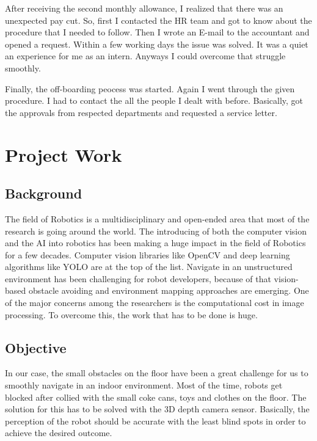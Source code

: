 \documentclass[twoside,12pt,times,onecolumn,a4paper]{report}
\begin{document}
After receiving the second monthly allowance, I realized that there was an unexpected pay cut. So, first I contacted the HR team and got to know about the procedure that I needed to follow. Then I wrote an E-mail to the accountant and opened a request. Within a few working days the issue was solved. It was a quiet an experience for me as an intern. Anyways I could overcome that struggle smoothly. 

Finally, the off-boarding peocess was started. Again I went through the given procedure. I had to contact the all the people I dealt with before. Basically, got the approvals from respected departments and requested a service letter. 


\chapter{Project Work}

\section{Background}

\hspace{3em}The field of Robotics is a multidisciplinary and open-ended area that most of 
the research is going around the world. The introducing of both the computer vision 
and the AI into robotics has been making a huge impact in the field of Robotics for 
a few decades. Computer vision libraries like OpenCV and deep learning 
algorithms like YOLO are at the top of the list. Navigate in an unstructured 
environment has been challenging for robot developers, because of that vision-based obstacle avoiding and environment mapping approaches are emerging. One 
of the major concerns among the researchers is the computational cost in image 
processing. To overcome this, the work that has to be done is huge.

\section{Objective}

In our case, the small obstacles on the floor have been a great challenge for 
us to smoothly navigate in an indoor environment. Most of the time, robots get 
blocked after collied with the small coke cans, toys and clothes on the floor. 
The solution for this has to be solved with the 3D depth camera sensor. Basically, 
the perception of the robot should be accurate with the least blind spots in order to 
achieve the desired outcome. 
\end{document}
